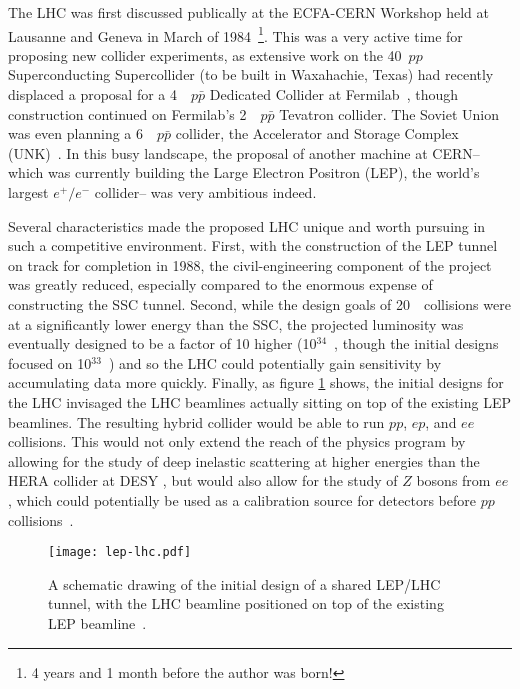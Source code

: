 The LHC was first discussed publically at the ECFA-CERN Workshop held at Lausanne and Geneva in March of 1984~\cite{ECFA1984}\footnote{4 years and 1 month before the author was born!}. This was a very active time for proposing new collider experiments, as extensive work on the 40~\TeV $pp$ Superconducting Supercollider (to be built in Waxahachie, Texas) had recently displaced a proposal for a 4~\TeV~$p\bar{p}$ Dedicated Collider at Fermilab~\cite{ECFA1984,DC}, though construction continued on Fermilab's 2~\TeV~$p\bar{p}$ Tevatron collider. The Soviet Union was even planning a 6~\TeV~$p\bar{p}$ collider, the Accelerator and Storage Complex (UNK)~\cite{UNK}. In this busy landscape, the proposal of another machine at CERN-- which was currently building the Large Electron Positron (LEP), the world's largest $e^+/e^-$ collider-- was very ambitious indeed.

Several characteristics made the proposed LHC unique and worth pursuing in such a competitive environment. First, with the construction of the LEP tunnel on track for completion in 1988, the civil-engineering component of the project was greatly reduced, especially compared to the enormous expense of constructing the SSC tunnel. Second, while the design goals of 20~\TeV~collisions were at a significantly lower energy than the SSC, the projected luminosity was eventually designed to be a factor of 10 higher (10$^{34}$~\lumirate, though the initial designs focused on 10$^{33}$~\lumirate) and so the LHC could potentially gain sensitivity by accumulating data more quickly. Finally, as figure \ref{fig:lhc:lep-lhc} shows, the initial designs for the LHC invisaged the LHC beamlines actually sitting on top of the existing LEP beamlines. The resulting hybrid collider would be able to run $pp$, $ep$, and $ee$ collisions. This would not only extend the reach of the physics program by allowing for the study of deep inelastic scattering at higher energies than the HERA collider at DESY , but would also allow for the study of $Z$ bosons from $ee$, which could potentially be used as a calibration source for detectors before $pp$ collisions~\cite{ECFA1984}.


\begin{figure}
\centering
\texttt{[image: lep-lhc.pdf]}
\label{fig:lhc:lep-lhc}
\caption{A schematic drawing of the initial design of a shared LEP/LHC tunnel, with the LHC beamline positioned on top of the existing LEP beamline~\cite{ECFA1984}.}
\end{figure}

